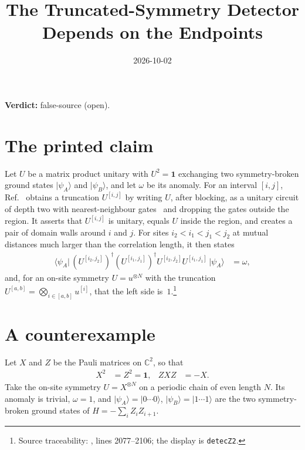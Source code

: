 \documentclass{article}
\title{The Truncated-Symmetry Detector Depends on the Endpoints}
\author{}
\date{2026-10-02}
\providecommand{\gapnote}[2]{%
    \par\noindent\textbf{Verdict:} #1 (#2).\par}
\begin{document}
\maketitle
\gapnote{false-source}{open}

\section{The printed claim}

Let $U$ be a matrix product unitary with $U^2=\mathbf 1$ exchanging two
symmetry-broken ground states $\lvert\psi_A\rangle$ and
$\lvert\psi_B\rangle$, and let $\omega$ be its anomaly. For an interval
$[i,j]$, Ref.~\cite{GarreRubioSchuch2024DomainWall} obtains a truncation
$U^{[i,j]}$ by writing $U$, after blocking, as a unitary circuit of depth two
with nearest-neighbour gates~\cite{Cirac2017MPU} and dropping the gates outside
the region. It asserts that $U^{[i,j]}$ is unitary, equals $U$ inside the region,
and creates a pair of domain walls around $i$ and $j$. For sites
$i_2<i_1<j_1<j_2$ at mutual distances much larger than the correlation length,
it then states
\begin{align}
    \langle\psi_A\rvert\,(U^{[i_2,j_2]})^\dagger(U^{[i_1,j_1]})^\dagger
    U^{[i_2,j_2]}U^{[i_1,j_1]}\,\lvert\psi_A\rangle
     & =\omega,
    \label{eq:gs24td_detector}
\end{align}
and, for an on-site symmetry $U=u^{\otimes N}$ with the truncation
$U^{[a,b]}=\bigotimes_{i\in[a,b]}u^{[i]}$, that the left side
is~$1$.\footnote{Source traceability: ,
    lines 2077--2106; the display is \texttt{detecZ2}.}

\section{A counterexample}

Let $X$ and $Z$ be the Pauli matrices on $\mathbb C^2$, so that
\begin{align}
    X^2 & =Z^2=\mathbf 1, & ZXZ & =-X.
    \label{eq:gs24td_pauli}
\end{align}
Take the on-site symmetry $U=X^{\otimes N}$ on a periodic chain of even length
$N$. Its anomaly is trivial, $\omega=1$, and $\lvert\psi_A\rangle=\lvert0\cdots0\rangle$,
$\lvert\psi_B\rangle=\lvert1\cdots1\rangle$ are the two symmetry-broken ground
states of $H=-\sum_iZ_iZ_{i+1}$.
\end{document}
